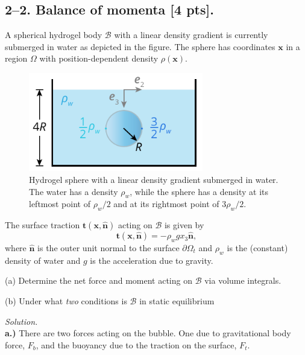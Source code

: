 \medskip
\subsection*{2--2. \textbf{Balance of momenta} [4 pts].} A spherical hydrogel body $\mathcal{B}$ with a linear density gradient is currently submerged in water as depicted in the figure. 
The sphere has coordinates $\bm{x}$ in a region $\Omega$ with position-dependent density $\rho(\bm{x})$. 

\begin{figure}[H]
\vspace{-2em}
\centering
\includegraphics[width=3in]{instr-figures/PS2-Q1.pdf}
\caption{\small{Hydrogel sphere with a linear density gradient submerged in water. The water has a density $\rho_w$, while the sphere has a density at its leftmost point of $\rho_w/2$ and at its rightmost point of $3\rho_w/2$.}}
\end{figure}

\vspace{-1em}
The surface traction $\bm{t}(\bm{x},\hat{\bm{n}})$ acting on $\mathcal{B}$ is given by 
\begin{equation*}
\bm{t}(\bm{x},\hat{\bm{n}}) = -\rho_w g x_3 \hat{\bm{n}},
\end{equation*}
where $\hat{\bm{n}}$ is the outer unit normal to the surface $\partial \Omega_t$ and $\rho_w$ is the (constant) density of water and $g$ is the acceleration due to gravity. 

\medskip
(a) Determine the net force and moment acting on $\mathcal{B}$ via volume integrals.

\medskip
(b) Under what \textit{two} conditions is $\mathcal{B}$ in static equilibrium

\bigskip

\textit{Solution.}\\

\textbf{a.)} There are two forces acting on the bubble. One due to gravitational body force, $F_b$, and the buoyancy due to the traction on the surface, $F_t$. 

